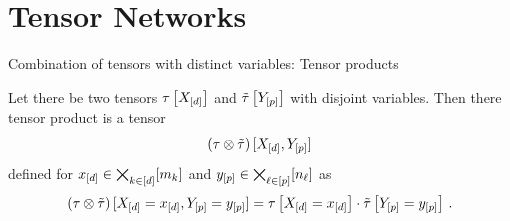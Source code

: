 \documentclass{beamer}
\begin{document}
    \section{Tensor Networks}

    \begin{frame}{Combination of tensors with distinct variables: Tensor products}
        \begin{definition}
            \label{def:tensorProduct}
            Let there be two tensors $\tau\left[X_{[d]}\right]$ and $\tilde{\tau}\left[Y_{[p]}\right]$ with disjoint variables.
            Then there tensor product is a tensor
            \begin{align*}
                (\hypercore \otimes \sechypercore)\,[\shortcatvariables,\headvariables] %
            \end{align*}
            defined for $x_{[d]}\in\bigtimes_{k\in[d]}[m_{k}]$ and $y_{[p]}\in\bigtimes_{\ell\in[p]}[n_{\ell}]$ as
            \begin{align*}
                (\tau \otimes \tilde{\tau})
                \,[X_{[d]}=x_{[d]},Y_{[p]}=y_{[p]}]
                =  \tau\left[X_{[d]}=x_{[d]}\right] \cdot \tilde{\tau}\left[Y_{[p]}=y_{[p]}\right] \, .
            \end{align*}
        \end{definition}

\end{frame}
\end{document}
